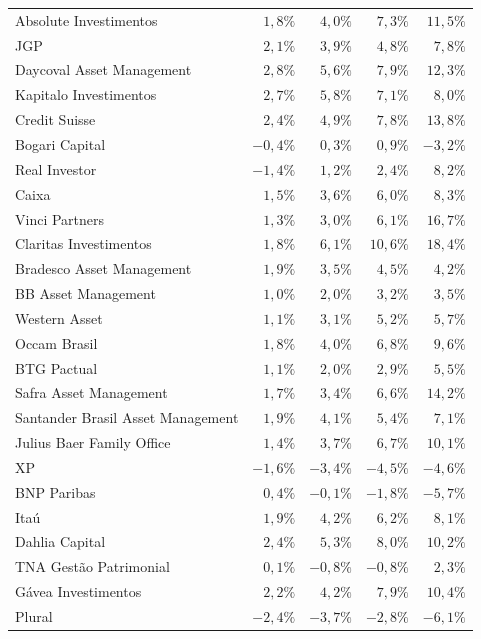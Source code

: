 \documentclass[12pt,a4paper]{article}
\begin{document}
\begin{center}
\begin{longtable}{@{}lrrrr@{}}
Absolute Investimentos & $1{,}8\%$ & $4{,}0\%$ & $7{,}3\%$ & $11{,}5\%$ \\
JGP & $2{,}1\%$ & $3{,}9\%$ & $4{,}8\%$ & $7{,}8\%$ \\
Daycoval Asset Management & $2{,}8\%$ & $5{,}6\%$ & $7{,}9\%$ & $12{,}3\%$ \\
Kapitalo Investimentos & $2{,}7\%$ & $5{,}8\%$ & $7{,}1\%$ & $8{,}0\%$ \\
Credit Suisse & $2{,}4\%$ & $4{,}9\%$ & $7{,}8\%$ & $13{,}8\%$ \\
Bogari Capital & $-0{,}4\%$ & $0{,}3\%$ & $0{,}9\%$ & $-3{,}2\%$ \\
Real Investor & $-1{,}4\%$ & $1{,}2\%$ & $2{,}4\%$ & $8{,}2\%$ \\
Caixa & $1{,}5\%$ & $3{,}6\%$ & $6{,}0\%$ & $8{,}3\%$ \\
Vinci Partners & $1{,}3\%$ & $3{,}0\%$ & $6{,}1\%$ & $16{,}7\%$ \\
Claritas Investimentos & $1{,}8\%$ & $6{,}1\%$ & $10{,}6\%$ & $18{,}4\%$ \\
Bradesco Asset Management & $1{,}9\%$ & $3{,}5\%$ & $4{,}5\%$ & $4{,}2\%$ \\
BB Asset Management & $1{,}0\%$ & $2{,}0\%$ & $3{,}2\%$ & $3{,}5\%$ \\
Western Asset & $1{,}1\%$ & $3{,}1\%$ & $5{,}2\%$ & $5{,}7\%$ \\
Occam Brasil & $1{,}8\%$ & $4{,}0\%$ & $6{,}8\%$ & $9{,}6\%$ \\
BTG Pactual & $1{,}1\%$ & $2{,}0\%$ & $2{,}9\%$ & $5{,}5\%$ \\
Safra Asset Management & $1{,}7\%$ & $3{,}4\%$ & $6{,}6\%$ & $14{,}2\%$ \\
Santander Brasil Asset Management & $1{,}9\%$ & $4{,}1\%$ & $5{,}4\%$ & $7{,}1\%$ \\
Julius Baer Family Office & $1{,}4\%$ & $3{,}7\%$ & $6{,}7\%$ & $10{,}1\%$ \\
XP & $-1{,}6\%$ & $-3{,}4\%$ & $-4{,}5\%$ & $-4{,}6\%$ \\
BNP Paribas & $0{,}4\%$ & $-0{,}1\%$ & $-1{,}8\%$ & $-5{,}7\%$ \\
Itaú & $1{,}9\%$ & $4{,}2\%$ & $6{,}2\%$ & $8{,}1\%$ \\
Dahlia Capital & $2{,}4\%$ & $5{,}3\%$ & $8{,}0\%$ & $10{,}2\%$ \\
TNA Gestão Patrimonial & $0{,}1\%$ & $-0{,}8\%$ & $-0{,}8\%$ & $2{,}3\%$ \\
Gávea Investimentos & $2{,}2\%$ & $4{,}2\%$ & $7{,}9\%$ & $10{,}4\%$ \\
Plural & $-2{,}4\%$ & $-3{,}7\%$ & $-2{,}8\%$ & $-6{,}1\%$ \\
\end{longtable}
\end{center}
\end{document}
